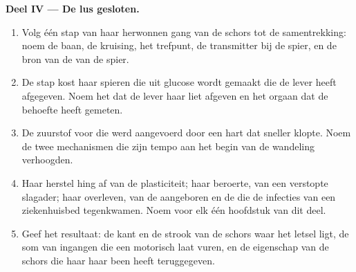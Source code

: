 \begin{problem}
\medskip
\noindent\textbf{Deel IV --- De lus gesloten.}
\begin{enumerate}[resume]
  \item Volg één stap van haar herwonnen gang van de schors tot de
        samentrekking: noem de baan, de kruising, het trefpunt, de
        transmitter bij de spier, en de bron van de  van de spier.
  \item De stap kost haar spieren  die uit glucose wordt gemaakt die de
        lever heeft afgegeven. Noem het  dat de lever haar liet
        afgeven en het orgaan dat de behoefte heeft gemeten.
  \item De zuurstof voor die  werd aangevoerd door een hart dat sneller
        klopte. Noem de twee mechanismen die zijn tempo aan het begin van
        de wandeling verhoogden.
  \item Haar herstel hing af van de plasticiteit; haar beroerte, van een
        verstopte slagader; haar overleven, van de aangeboren en de
         die de infecties van een ziekenhuisbed
        tegenkwamen. Noem voor elk één hoofdstuk van dit deel.
  \item Geef het resultaat: de kant en de strook van de schors waar het
        letsel ligt, de som van ingangen die een motorisch  laat
        vuren, en de eigenschap van de schors die haar haar been heeft
        teruggegeven.
\end{enumerate}
\end{problem}
